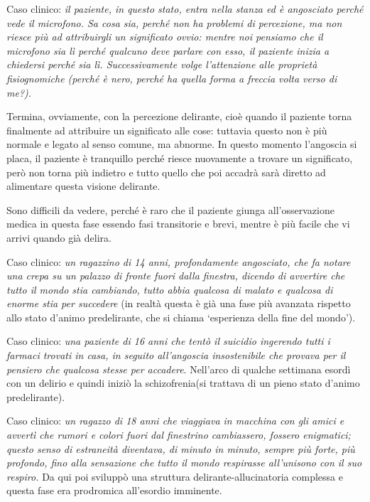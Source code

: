 Caso clinico: \emph{il paziente, in questo stato, entra nella stanza ed
è angosciato perché vede il microfono. Sa cosa sia, perché non ha
problemi di percezione, ma non riesce più ad attribuirgli un significato
ovvio: mentre noi pensiamo che il microfono sia lì perché qualcuno deve
parlare con esso, il paziente inizia a chiedersi perché sia lì.
Successivamente volge l'attenzione alle proprietà fisiognomiche (perché
è nero, perché ha quella forma a freccia volta verso di me?). }

Termina, ovviamente, con la percezione delirante, cioè quando il
paziente torna finalmente ad attribuire un significato alle cose:
tuttavia questo non è più normale e legato al senso comune, ma abnorme.
In questo momento l'angoscia si placa, il paziente è tranquillo perché
riesce nuovamente a trovare un significato, però non torna più indietro
e tutto quello che poi accadrà sarà diretto ad alimentare questa visione
delirante.

Sono difficili da vedere, perché è raro che il paziente giunga
all'osservazione medica in questa fase essendo fasi transitorie e brevi,
mentre è più facile che vi arrivi quando già delira.

Caso clinico: \emph{un ragazzino di 14 anni, profondamente angosciato,
che fa notare una crepa su un palazzo di fronte fuori dalla finestra,
dicendo di avvertire che tutto il mondo stia cambiando, tutto abbia
qualcosa di malato e qualcosa di enorme stia per succedere} (in realtà
questa è già una fase più avanzata rispetto allo stato d'animo
predelirante, che si chiama `esperienza della fine del mondo').

Caso clinico: \emph{una paziente di 16 anni che tentò il suicidio
ingerendo tutti i farmaci trovati in casa, in seguito all'angoscia
insostenibile che provava per il pensiero che qualcosa stesse per
accadere}. Nell'arco di qualche settimana esordì con un delirio e quindi
iniziò la schizofrenia(si trattava di un pieno stato d'animo
predelirante).

Caso clinico: \emph{un ragazzo di 18 anni che viaggiava in macchina con
gli amici e avvertì che rumori e colori fuori dal finestrino
cambiassero, fossero enigmatici; questo senso di estraneità diventava,
di minuto in minuto, sempre più forte, più profondo, fino alla
sensazione che tutto il mondo respirasse all'unisono con il suo
respiro.} Da qui poi sviluppò una struttura delirante-allucinatoria
complessa e questa fase era prodromica all'esordio imminente.

